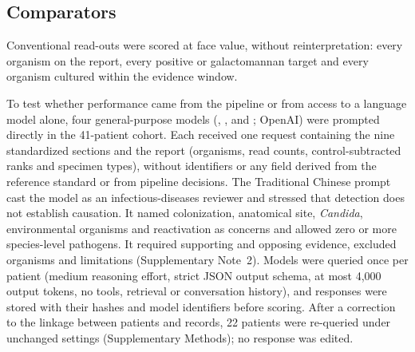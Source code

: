 \subsection*{Comparators}
Conventional read-outs were scored at face value, without reinterpretation: every organism on the \mngs report, every positive \filmarray or galactomannan target and every organism cultured within the evidence window. 

To test whether performance came from the pipeline or from access to a language model alone, four general-purpose models (\gptsol, \gptluna, \gptterra and \gptastra; OpenAI) were prompted directly in the 41-patient cohort. Each received one request containing the nine standardized sections and the \mngs report (organisms, read counts, control-subtracted ranks and specimen types), without identifiers or any field derived from the reference standard or from pipeline decisions. The Traditional Chinese prompt cast the model as an infectious-diseases reviewer and stressed that detection does not establish causation. It named colonization, anatomical site, \textit{Candida}, environmental organisms and reactivation as concerns and allowed zero or more species-level pathogens. It required supporting and opposing evidence, excluded organisms and limitations (Supplementary Note~2). Models were queried once per patient (medium reasoning effort, strict JSON output schema, at most 4,000 output tokens, no tools, retrieval or conversation history), and responses were stored with their hashes and model identifiers before scoring. After a correction to the linkage between patients and records, 22 patients were re-queried under unchanged settings (Supplementary Methods); no response was edited.

